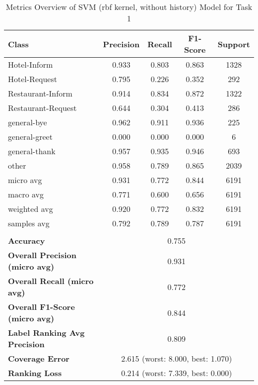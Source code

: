 
\begin{table}[h]
\centering

\begin{tabular}{|l|c|c|c|c|}
\hline
\textbf{Class}& \textbf{Precision} & \textbf{Recall} & \textbf{F1-Score} & \textbf{Support} \\ \hline
Hotel-Inform & 0.933 & 0.803 & 0.863 & 1328 \\ \hline
Hotel-Request & 0.795 & 0.226 & 0.352 & 292 \\ \hline
Restaurant-Inform & 0.914 & 0.834 & 0.872 & 1322 \\ \hline
Restaurant-Request & 0.644 & 0.304 & 0.413 & 286 \\ \hline
general-bye & 0.962 & 0.911 & 0.936 & 225 \\ \hline
general-greet & 0.000 & 0.000 & 0.000 & 6 \\ \hline
general-thank & 0.957 & 0.935 & 0.946 & 693 \\ \hline
other & 0.958 & 0.789 & 0.865 & 2039 \\ \hline\hline
micro avg & 0.931 & 0.772 & 0.844 & 6191 \\ \hline
macro avg & 0.771 & 0.600 & 0.656 & 6191 \\ \hline
weighted avg & 0.920 & 0.772 & 0.832 & 6191 \\ \hline
samples avg & 0.792 & 0.789 & 0.787 & 6191 \\ \hline
\multicolumn{5}{c}{}\\ \hline

\textbf{Accuracy}                    & \multicolumn{4}{c|}{0.755}                                 \\ \hline
\textbf{Overall Precision (micro avg)}           & \multicolumn{4}{c|}{0.931}                                \\ \hline
\textbf{Overall Recall (micro avg)}              & \multicolumn{4}{c|}{0.772}                                   \\ \hline
\textbf{Overall F1-Score (micro avg)}            & \multicolumn{4}{c|}{0.844}                                  \\ \hline
\textbf{Label Ranking Avg Precision} & \multicolumn{4}{c|}{0.809}                                    \\ \hline
\textbf{Coverage Error}              & \multicolumn{4}{c|}{2.615 (worst: 8.000, best: 1.070)}                             \\ \hline
\textbf{Ranking Loss}                & \multicolumn{4}{c|}{0.214 (worst: 7.339, best: 0.000)}                             \\ \hline
\end{tabular}

\caption{Metrics Overview of SVM (rbf kernel, without history) Model for Task 1}
\label{table:SVM (rbf kernel, withou history)_metrics_task_1}
\end{table}
    